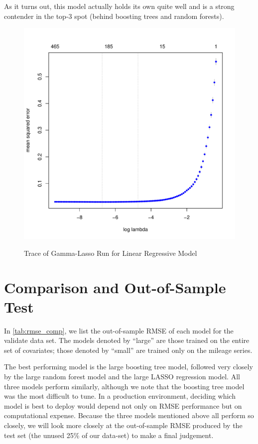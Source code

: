 \documentclass[11pt, fleqn]{article}
\begin{document}
As it turns out, this model actually holds its own quite well and is a strong contender in the top-3 spot (behind boosting trees and random forests).

\begin{figure}[!htb]
  \centering
  \caption{Trace of Gamma-Lasso Run for Linear Regressive Model}
  \includegraphics[scale=.5]{lin_reg_interaction.pdf}
  \label{fig:lin_reg}
\end{figure}

\section{Comparison and Out-of-Sample Test}

In \cref{tab:rmse_comp}, we list the out-of-sample RMSE of each model for the validate data set. The models denoted by ``large'' are those trained on the entire set of covariates; those denoted by ``small'' are trained only on the mileage series.

The best performing model is the large boosting tree model, followed very closely by the large random forest model and the large LASSO regression model. All three models perform similarly, although we note that the boosting tree model was the most difficult to tune. In a production environment, deciding which model is best to deploy would depend not only on RMSE performance but on computational expense. Because the three models mentioned above all perform so closely, we will look more closely at the out-of-sample RMSE produced by the test set (the unused 25\% of our data-set) to make a final judgement.
\end{document}
